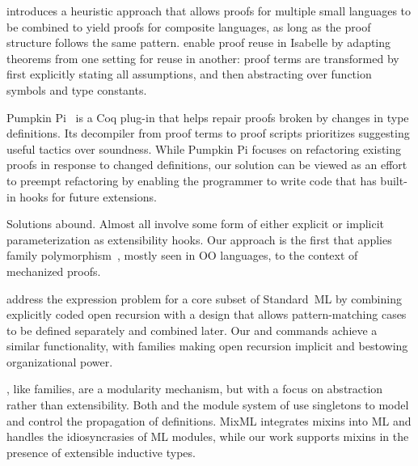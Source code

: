 \citet{mulhern2006proof} introduces a heuristic approach that allows proofs
for multiple small languages to be combined to yield proofs for
composite languages, as long as the proof structure follows the same
pattern.
%
\citet{johlut2004} enable proof reuse in Isabelle by adapting theorems
from one setting for reuse in another: proof terms are transformed
by first explicitly stating all assumptions, and then abstracting over
function symbols and type constants.

Pumpkin Pi~\cite{ringer2021pumpkin} is a Coq plug-in that helps
repair proofs broken by changes in type definitions.
Its decompiler from proof terms to proof scripts prioritizes suggesting
useful tactics over soundness.
While Pumpkin Pi focuses on refactoring existing proofs in response to
changed definitions,
our solution can be viewed as an effort to preempt refactoring by
enabling the programmer to write code that has built-in hooks for
future extensions.

 Solutions abound.
Almost all involve some form of either explicit or implicit parameterization
as extensibility hooks.
Our approach is the first that applies family polymorphism~\cite{ernst2001family},
mostly seen in OO languages,
to the context of mechanized proofs.

\citet{bac2006} address the expression problem for a core subset of Standard~ML
by combining explicitly coded open recursion with a design that
allows pattern-matching cases to be defined separately and combined
later.
Our  and  commands achieve a similar
functionality, with families making open recursion implicit and
bestowing organizational power.

\!\!, like families, are a modularity mechanism,
but with a focus on abstraction rather than extensibility.
Both \TT and the module system of \citet{stohar2000} use singletons to model and
control the propagation of definitions.
\mbox{MixML} \cite{rosdre2013} integrates mixins into ML and handles the
idiosyncrasies of ML modules,
while our work supports mixins in the presence of extensible inductive types.



